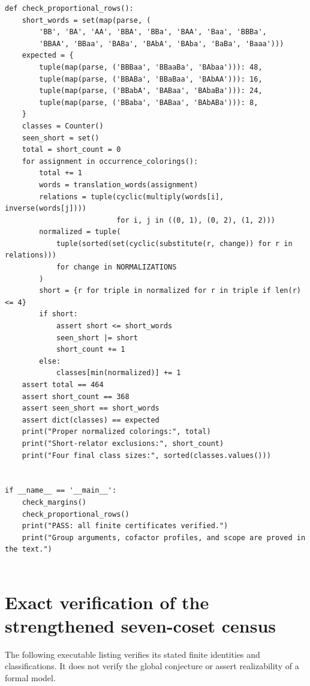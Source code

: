 \documentclass[11pt,a4paper,oneside]{report}
\theoremstyle{definition}
\theoremstyle{remark}
\begin{document}
\begin{lstlisting}
def check_proportional_rows():
    short_words = set(map(parse, (
        'BB', 'BA', 'AA', 'BBA', 'BBa', 'BAA', 'Baa', 'BBBa',
        'BBAA', 'BBaa', 'BABa', 'BAbA', 'BAba', 'BaBa', 'Baaa')))
    expected = {
        tuple(map(parse, ('BBBaa', 'BBaaBa', 'BAbaa'))): 48,
        tuple(map(parse, ('BBABa', 'BBaBaa', 'BAbAA'))): 16,
        tuple(map(parse, ('BBabA', 'BABaa', 'BAbaBa'))): 24,
        tuple(map(parse, ('BBaba', 'BABaa', 'BAbABa'))): 8,
    }
    classes = Counter()
    seen_short = set()
    total = short_count = 0
    for assignment in occurrence_colorings():
        total += 1
        words = translation_words(assignment)
        relations = tuple(cyclic(multiply(words[i], inverse(words[j])))
                          for i, j in ((0, 1), (0, 2), (1, 2)))
        normalized = tuple(
            tuple(sorted(set(cyclic(substitute(r, change)) for r in relations)))
            for change in NORMALIZATIONS
        )
        short = {r for triple in normalized for r in triple if len(r) <= 4}
        if short:
            assert short <= short_words
            seen_short |= short
            short_count += 1
        else:
            classes[min(normalized)] += 1
    assert total == 464
    assert short_count == 368
    assert seen_short == short_words
    assert dict(classes) == expected
    print("Proper normalized colorings:", total)
    print("Short-relator exclusions:", short_count)
    print("Four final class sizes:", sorted(classes.values()))


if __name__ == '__main__':
    check_margins()
    check_proportional_rows()
    print("PASS: all finite certificates verified.")
    print("Group arguments, cofactor profiles, and scope are proved in the text.")


\end{lstlisting}


\clearpage
\section{Exact verification of the strengthened seven-coset census}
The following executable listing verifies its stated finite
identities and classifications. It does not verify the global
conjecture or assert realizability of a formal model.
\end{document}
